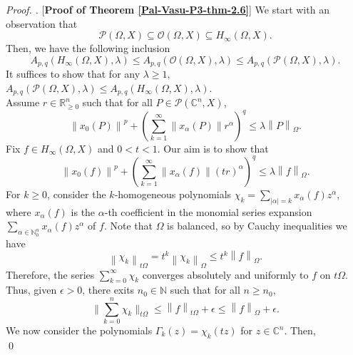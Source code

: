 \documentclass[a4paper,12pt]{amsart}
\theoremstyle{definition}
\newenvironment{pf}[1][]{%
 \vskip 3mm
 \noindent
 \ifthenelse{\equal{#1}{}}%
  {{\slshape Proof. }}%
  {{\slshape #1.} }%
 }%
{\qed\bigskip}
\newcommand{\norm}[1]{\left\lVert#1\right\rVert}
\begin{document}
\begin{pf} [{\bf Proof of Theorem \ref{Pal-Vasu-P3-thm-2.6}}]
	We start with an observation that 
	\begin{equation*}
		\mathcal{P}(\Omega, X)\subseteq \mathcal{O}(\Omega, X)\subseteq H_{\infty}(\Omega, X).
	\end{equation*}
	Then, we have the following inclusion
	\begin{equation*}
		A_{p,q}(H_{\infty}(\Omega, X), \lambda) \leq A_{p,q}(\mathcal{O}(\Omega, X), \lambda) \leq A_{p,q}(\mathcal{P}(\Omega, X), \lambda).
	\end{equation*}
	It suffices to show that for any $\lambda\geq 1$, $A_{p,q}(\mathcal{P}(\Omega, X), \lambda)\leq 	A_{p,q}(H_{\infty}(\Omega, X), \lambda)$.\\[2mm]
	Assume $r\in \mathbb{R}^n_{\geq 0}$ such that for all $P\in \mathcal{P}(\mathbb{C}^n, X)$,
	\begin{equation}\label{Pal-Vasu-P3-e-2.14}
		\norm{x_0(P)}^p+\left(\sum_{k=1}^{\infty}\norm{x_{\alpha}(P)}r^{\alpha}\right)^q\leq \lambda \norm{P}_{\Omega}.
	\end{equation}
	Fix $f\in H_{\infty}(\Omega, X)$ and $0<t<1$. Our aim is to show that 
	\begin{equation}\label{Pal-Vasu-P3-e-2.15}
		\norm{x_0(f)}^p+\left(\sum_{k=1}^{\infty}\norm{x_{\alpha}(f)}(tr)^{\alpha}\right)^q\leq \lambda \norm{f}_{\Omega}.
	\end{equation}
	For $k\geq 0$, consider the $k$-homogeneous polynomials $\chi_{k}=\sum_{|\alpha|=k}x_{\alpha}(f)z^{\alpha}$, where $x_{\alpha}(f)$ is the $\alpha$-th coefficient in the monomial series expansion $\sum_{\alpha\in \mathbb{N}^n_{0}}x_{\alpha}(f)z^{\alpha}$ of $f$. Note that $\Omega$ is balanced, so by Cauchy inequalities we have 
	\begin{equation}\label{Pal-Vasu-P3-e-2.16}
		\norm{\chi_{k}}_{t\Omega}=t^k\norm{\chi_{k}}_{\Omega}\leq t^k \norm{f}_{\Omega}.
	\end{equation}
	Therefore, the series $\sum_{k=0}^{\infty}\chi_{k}$ converges absolutely and uniformly to $f$ on $t\Omega$. Thus, given $\epsilon>0$, there exits $n_0 \in \mathbb{N}$ such that for all $n \geq n_0$,
	\begin{equation*}
		\bigg\|\sum_{k=0}^{n}\chi_{k}\bigg\|_{t\Omega}\leq \norm{f}_{t\Omega} + \epsilon \leq \norm{f}_{\Omega}+\epsilon.
	\end{equation*}
	We now consider the polynomials $\Gamma_{k}(z)=\chi_{k}(tz)$ for $z\in \mathbb{C}^n$. Then,
	\begin{equation*}

\end{equation*}
\end{pf}
\end{document}
